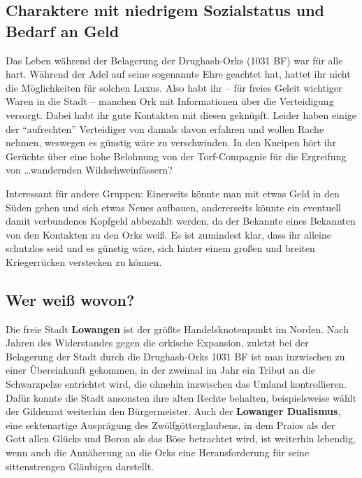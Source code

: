 \subsection*{Charaktere mit niedrigem Sozialstatus und Bedarf an Geld}
Das Leben während der Belagerung der Drughash-Orks (1031 BF) war für alle hart.
Während der Adel auf seine sogenannte Ehre geachtet hat, hattet ihr nicht die Möglichkeiten für solchen Luxus.
Also habt ihr -- für freies Geleit wichtiger Waren in die Stadt -- manchen Ork mit Informationen über die Verteidigung versorgt.
Dabei habt ihr gute Kontakten mit diesen geknüpft.
Leider haben einige der \enquote{aufrechten} Verteidiger von damals davon erfahren und wollen Rache nehmen, weswegen es günstig wäre zu verschwinden.
In den Kneipen hört ihr Gerüchte über eine hohe Belohnung von der Torf-Compagnie für die Ergreifung von \dots wandernden Wildschweinfässern?

Interessant für andere Gruppen: Einerseits könnte man mit etwas
Geld in den Süden gehen und sich etwas Neues aufbauen,
andererseits könnte ein eventuell damit verbundenes Kopfgeld
abbezahlt werden, da der Bekannte eines Bekannten von den
Kontakten zu den Orks weiß. Es ist zumindest klar, dass ihr
alleine schutzlos seid und es günstig wäre, sich hinter einem
großen und breiten Kriegerrücken verstecken zu können.

\spaltenende

\subsection*{Wer weiß wovon?}

\spaltenanfang



Die freie Stadt \textbf{Lowangen} ist der größte Handelsknotenpunkt im Norden.
Nach Jahren des Widerstandes gegen die orkische Expansion, zuletzt bei der Belagerung der Stadt durch die Drughash-Orks 1031 BF ist man inzwischen zu einer Übereinkunft gekommen, in der zweimal im Jahr ein Tribut an die Schwarzpelze entrichtet wird, die ohnehin inzwischen das Umland kontrollieren.
Dafür konnte die Stadt ansonsten ihre alten Rechte behalten, beispielsweise wählt der Gildenrat weiterhin den Bürgermeister.
Auch der \textbf{Lowanger Dualismus}, eine sektenartige Ausprägung des Zwölfgötterglaubens, in dem Praios als der Gott allen Glücks und Boron als das Böse betrachtet wird, ist weiterhin lebendig, wenn auch die Annäherung an die Orks eine Herausforderung für seine sittenstrengen Gläubigen darstellt.


